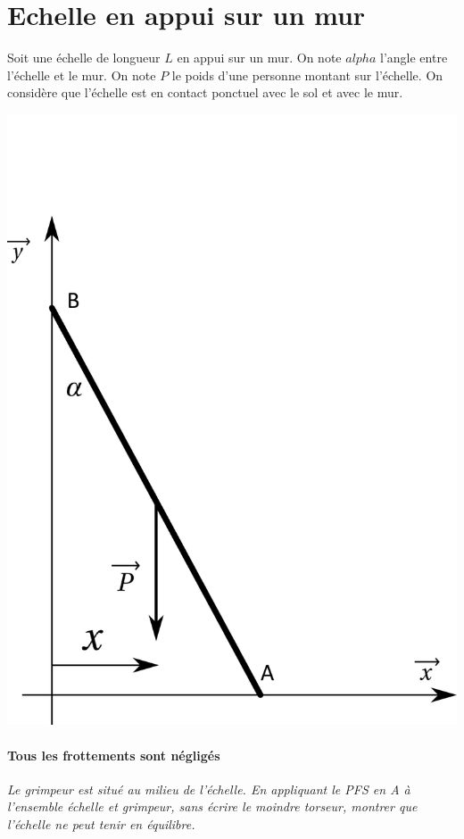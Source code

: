 \documentclass[10pt,oneside]{article}
\begin{document}
\section*{Echelle en appui sur un mur}
\begin{minipage}[c]{.7\textwidth}
Soit une échelle de longueur $L$ en appui sur un mur. On note $alpha$ l'angle entre l'échelle et le mur. On note $P$ le poids d'une personne montant sur l'échelle. On considère que l'échelle est en contact ponctuel avec le sol et avec le mur.
\end{minipage} \hfill
\begin{minipage}[c]{.25\textwidth}
\begin{center}
\includegraphics[width=\textwidth]{png/echelle}
\end{center}
\end{minipage}

\setcounter{paragraph}{0}
\paragraph{Tous les frottements sont négligés}
\textit{Le grimpeur est situé au milieu de l'échelle. En appliquant le PFS en A à l'ensemble échelle et grimpeur, sans écrire le moindre torseur, montrer que l'échelle ne peut tenir en équilibre.}
\end{document}
